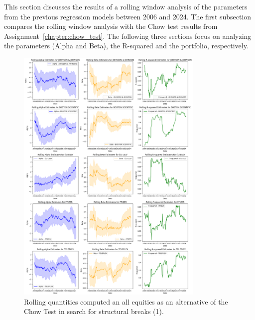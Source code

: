 This section discusses the results of a rolling window analysis of the parameters from the previous regression models between 
2006 and 2024.
The first subsection compares the rolling window analysis with the Chow test results from Assignment~\ref{chapter:chow_test}.
The following three sections focus on analyzing the parameters (Alpha and Beta), the R-squared and the portfolio,
respectively.

\begin{figure}[p]
    \centering
    \includegraphics[width=0.8\textwidth]{images/rolling_quantities_1.png}
    \caption{Rolling quantities computed an all equities as an alternative of the Chow Test in search for structural
    breaks (1).}\label{fig:rolling_quantities_1}
\end{figure}
